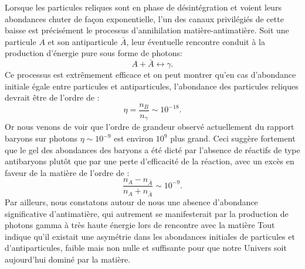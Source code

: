 Lorsque les particules reliques sont en phase de désintégration et voient leurs abondances chuter de façon exponentielle, l'un des canaux privilégiés de cette baisse est précisément le processus d'annihilation matière-antimatière. Soit une particule $A$ et son antiparticule $\bar A$, leur éventuelle rencontre conduit à la production d'énergie pure sous forme de photons:
\begin{equation}
A+ \bar A \leftrightarrow \gamma.
\end{equation}
 Ce processus est extrêmement efficace et on peut montrer qu'en cas d'abondance initiale égale entre particules et antiparticules, l'abondance des particules reliques devrait être de l'ordre de :
 \begin{equation}
 \eta=\frac{n_B}{n_\gamma}\sim10^{-18}.
 \end{equation}
 Or nous venons de voir que l'ordre de grandeur observé actuellement du rapport baryons sur photons $\eta\sim10^{-9}$ est environ $10^9$ plus grand. Ceci suggère fortement que le gel des abondances des baryons a été dicté par l'absence de réactifs de type antibaryons plutôt que par une perte d'efficacité de la réaction, avec un excès en faveur de la matière de l'ordre de :
 \begin{equation}
 \frac{n_A-n_{\bar A}}{n_A+n_{\bar A}}\sim10^{-9}.
 \end{equation}
 Par ailleurs, nous constatons autour de nous une absence d'abondance significative d'antimatière, qui autrement se manifesterait par la production de photons gamma à très haute énergie lors de rencontre avec la matière  Tout indique qu'il existait une asymétrie dans les abondances initiales de particules et d'antiparticules, faible mais non nulle et suffisante pour que notre Univers soit aujourd'hui dominé par la matière.
 
